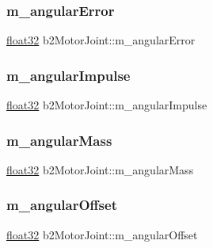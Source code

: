 \subsubsection{\texorpdfstring{m\_angularError}{m\_angularError}}
{\footnotesize\ttfamily \mbox{\hyperlink{b2_settings_8h_aacdc525d6f7bddb3ae95d5c311bd06a1}{float32}} b2\+Motor\+Joint\+::m\+\_\+angular\+Error\hspace{0.3cm}{\ttfamily [protected]}}

\mbox{\label{classb2_motor_joint_abf23ffd98f99bdf34423bee99e40a949}} 
\subsubsection{\texorpdfstring{m\_angularImpulse}{m\_angularImpulse}}
{\footnotesize\ttfamily \mbox{\hyperlink{b2_settings_8h_aacdc525d6f7bddb3ae95d5c311bd06a1}{float32}} b2\+Motor\+Joint\+::m\+\_\+angular\+Impulse\hspace{0.3cm}{\ttfamily [protected]}}

\mbox{\label{classb2_motor_joint_a3718dc3784fb4f09ecf42d28c9896ecc}} 
\subsubsection{\texorpdfstring{m\_angularMass}{m\_angularMass}}
{\footnotesize\ttfamily \mbox{\hyperlink{b2_settings_8h_aacdc525d6f7bddb3ae95d5c311bd06a1}{float32}} b2\+Motor\+Joint\+::m\+\_\+angular\+Mass\hspace{0.3cm}{\ttfamily [protected]}}

\mbox{\label{classb2_motor_joint_ac48f242920da2d2678dea09941c3d31c}} 
\subsubsection{\texorpdfstring{m\_angularOffset}{m\_angularOffset}}
{\footnotesize\ttfamily \mbox{\hyperlink{b2_settings_8h_aacdc525d6f7bddb3ae95d5c311bd06a1}{float32}} b2\+Motor\+Joint\+::m\+\_\+angular\+Offset\hspace{0.3cm}{\ttfamily [protected]}}

